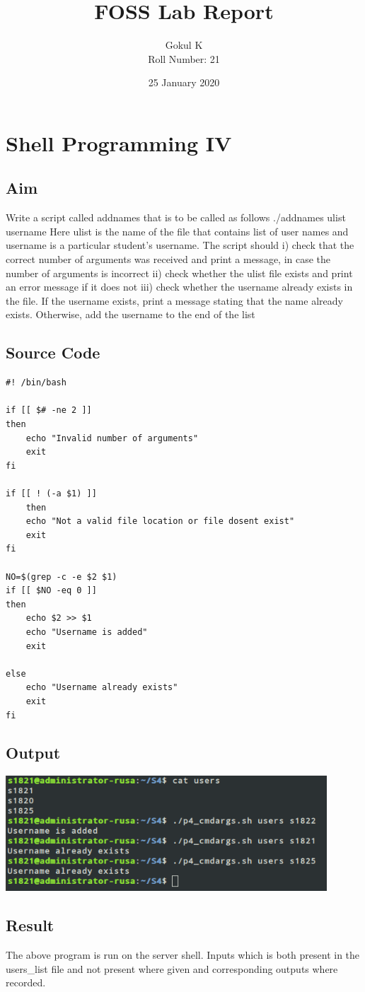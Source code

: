 \documentclass{article}
\begin{document}
\title{FOSS Lab Report}
\author{Gokul K\\[2\baselineskip]
Roll Number: 21\\[2\baselineskip]}
\date{25 January 2020}

\maketitle

\setcounter{section}{6}
\section{Shell Programming IV}
\subsection{Aim}
Write a script called addnames that is to be called as follows ./addnames ulist username
Here ulist is the name of the file that contains list of user names and username is a
particular student’s username. The script should
   i) check that the correct number of arguments was received and print a message, in
    case the number of arguments is incorrect
   ii) check whether the ulist file exists and print an error message if it does not
   iii) check whether the username already exists in the file. If the username exists, print a message stating that the name already exists. Otherwise, add the username to the end of the list

\subsection{Source Code}
\begin{verbatim}
#! /bin/bash

if [[ $# -ne 2 ]]
then
	echo "Invalid number of arguments"
	exit
fi

if [[ ! (-a $1) ]]
	then
	echo "Not a valid file location or file dosent exist"
	exit
fi

NO=$(grep -c -e $2 $1)
if [[ $NO -eq 0 ]]
then
	echo $2 >> $1
	echo "Username is added"
	exit

else
	echo "Username already exists"
	exit
fi
\end{verbatim}

\subsection{Output}
\includegraphics[width=0.9\textwidth]{img/p7.png}\newline

\subsection{Result}
The above program is run on the server shell. Inputs which is both present in the users_list file and not present where given and corresponding outputs where recorded.
\end{document}
